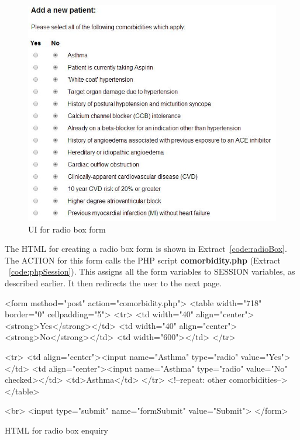 \documentclass[11pt]{article}
\begin{document}
\begin{enumerate}
\begin{figure}[ht]
\begin{center}
\includegraphics[scale=0.8]{comorbidity}
\caption{UI for radio box form}
\label{fig:comor}
\end{center}
\end{figure}

The HTML for creating a radio box form is shown in Extract~\ref{code:radioBox}. The ACTION for this form calls the PHP script \textbf{comorbidity.php} (Extract ~\ref{code:phpSession}). This assigns all the form variables to SESSION variables, as described earlier. It then redirects the user to the next page.


\begin{code}[ht]
\begin{html}

<form method="post" action="comorbidity.php">
      <table width="718" border="0" cellpadding="5">
        <tr>
          <td width="40" align="center"><strong>Yes</strong></td>
          <td width="40" align="center"><strong>No</strong></td>
          <td width="600"></td>
        </tr>
        
        <tr>
          <td align="center"><input name="Asthma" type="radio" value="Yes"></td>
          <td align="center"><input name="Asthma" type="radio" value="No" checked></td>
          <td>Asthma</td>
         </tr>
         <!--repeat: other comorbidities-->
         </table>
      
  <br>
  <input type="submit" name="formSubmit" value="Submit">
</form>
\end{html}
\caption{HTML for radio box enquiry}
\label{code:radioBox}
\end{code}


\end{enumerate}
\end{document}
